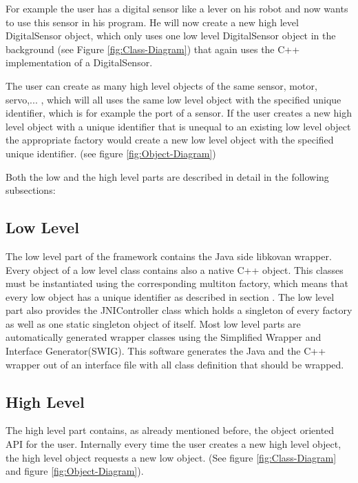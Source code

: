 \documentclass{juniorjournal}
\begin{document}
For example the user has a digital sensor like a lever on his robot and now
wants to use this sensor in his program. He will now create a new high level
DigitalSensor object, which only uses one low level DigitalSensor object in the
background (see Figure \ref{fig:Class-Diagram}) that again uses the C++ implementation of a DigitalSensor.

The user can create as many high level objects of the same sensor, motor,
servo,... , which will all uses the same low level object with the specified
unique identifier, which is for example the port of a sensor. If the user
creates a new high level object with a unique identifier that is unequal to
an existing low level object the appropriate factory would
create a new low level object with the specified unique identifier. (see figure \ref{fig:Object-Diagram})

Both the low and the high level parts are described in detail in the following subsections:

\subsection{Low Level}
The low level part of the framework contains the Java side libkovan wrapper.
Every object of a low level class contains also a native C++ object.
This classes must be instantiated using the corresponding multiton factory, which means that every low object has a unique identifier as described in section .
The low level part also provides the JNIController class which holds a singleton of every factory as well as one static singleton object of itself.
Most low level parts are automatically generated wrapper classes using the Simplified Wrapper and Interface Generator(SWIG\cite{SWIG}).
This software generates the Java and the C++ wrapper out of an interface file with all class definition that should be wrapped.

\subsection{High Level}
The high level part contains, as already mentioned before, the object oriented API for the user.
Internally every time the user creates a new high level object, the high level object requests a new low object.
(See figure \ref{fig:Class-Diagram} and figure \ref{fig:Object-Diagram}).
\end{document}
